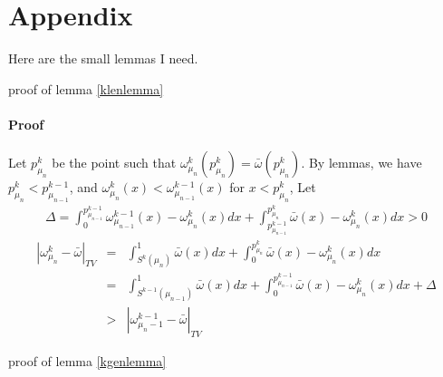 \section{Appendix}
Here are the small lemmas I need.

proof of lemma \ref{klenlemma}
\paragraph{Proof}
Let $p_{\mu_n}^k$ be the point such that $\omega_{\mu_n}^k(p_{\mu_n}^k) = \bar{\omega}(p_{\mu_n}^k)$. By lemmas, we have  $p_{\mu_n}^k < p_{\mu_{n-1}}^{k-1}$, and $\omega_{\mu_n}^k(x)< \omega_{\mu_{n-1}}^{k-1}(x)$ for $x< p_{\mu_n}^k $, Let
 \begin{eqnarray}
  \Delta =  \int_0^{p_{\mu_{n-1}}^{k-1}} \omega_{\mu_{n-1}}^{k-1}(x) -\omega_{\mu_n}^k(x) dx
            +\int_{p_{\mu_{n-1}}^{k-1}}^{p_{\mu_n}^k} \bar{\omega}(x) - \omega_{\mu_n}^k(x) dx >0
 \end{eqnarray} 
 \begin{eqnarray}
    |\omega_{\mu_n}^k - \bar{\omega}|_{TV} 
                & = & \int_{S^k(\mu_n)}^1  \bar{\omega}(x) dx +
                      \int_0^{p_{\mu_n}^k} \bar{\omega}(x) - \omega_{\mu_n}^k(x)dx \nonumber\\  
                & = & \int_{S^{k-1}(\mu_{n-1})}^1  \bar{\omega}(x) dx +
                      \int_0^{p_{\mu_{n-1}}^{k-1}} \bar{\omega}(x) - \omega_{\mu_n}^k(x)dx + \Delta \nonumber\\
                & > & |\omega_{\mu_n-1}^{k-1} - \bar{\omega}|_{TV}
 \end{eqnarray}

proof of lemma \ref{kgenlemma}

